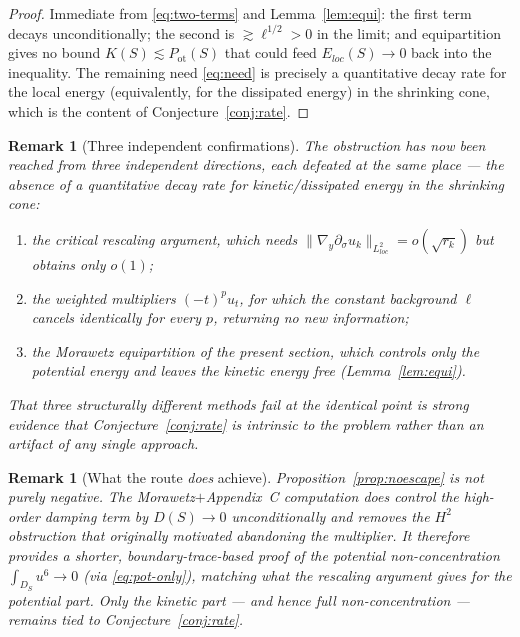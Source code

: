 \documentclass[11pt,letterpaper]{amsart}
\newtheorem{remark}[theorem]{Remark}
\begin{document}
\begin{proof}
Immediate from \eqref{eq:two-terms} and Lemma~\ref{lem:equi}: the first term decays
unconditionally; the second is $\gtrsim\ell^{1/2}>0$ in the limit; and equipartition gives no
bound $K(S)\lesssim P_{\mathrm{ot}}(S)$ that could feed $E_{loc}(S)\to0$ back into the inequality.
The remaining need \eqref{eq:need} is precisely a quantitative decay rate for the local energy
(equivalently, for the dissipated energy) in the shrinking cone, which is the content of
Conjecture~\ref{conj:rate}.
\end{proof}

\begin{remark}[Three independent confirmations]
The obstruction has now been reached from three independent directions, each defeated at the same
place --- the absence of a \emph{quantitative} decay rate for kinetic/dissipated energy in the
shrinking cone:
\begin{enumerate}
\item[(i)] the critical rescaling argument, which needs
$\|\nabla_y\partial_\sigma u_k\|_{L^2_{loc}}=o(\sqrt{r_k})$ but obtains only $o(1)$;
\item[(ii)] the weighted multipliers $(-t)^pu_t$, for which the constant background $\ell$ cancels
identically for every $p$, returning no new information;
\item[(iii)] the Morawetz equipartition of the present section, which controls only the potential
energy and leaves the kinetic energy free (Lemma~\ref{lem:equi}).
\end{enumerate}
That three structurally different methods fail at the identical point is strong evidence that
Conjecture~\ref{conj:rate} is intrinsic to the problem rather than an artifact of any single approach.
\end{remark}

\begin{remark}[What the route \emph{does} achieve]
Proposition~\ref{prop:noescape} is not purely negative. The Morawetz$+$Appendix~C computation
does control the high-order damping term by $D(S)\to0$ \emph{unconditionally} and removes the
$H^2$ obstruction that originally motivated abandoning the multiplier. It therefore provides a
shorter, boundary-trace-based proof of the \emph{potential} non-concentration
$\int_{D_S}u^6\to0$ (via \eqref{eq:pot-only}), matching what the rescaling argument gives for the
potential part. Only the kinetic part --- and hence full non-concentration --- remains tied to
Conjecture~\ref{conj:rate}.
\end{remark}
\end{document}
